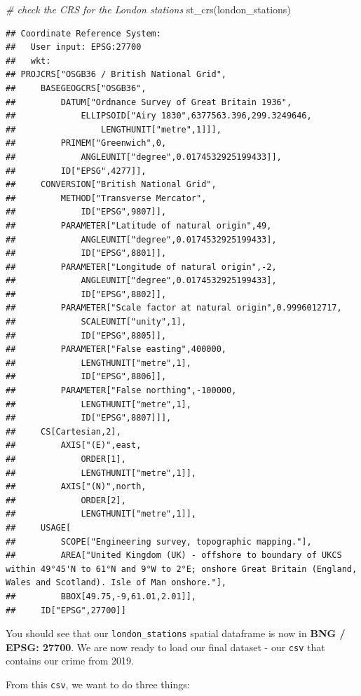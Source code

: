 \documentclass[
]{book}
\newenvironment{Shaded}{\begin{snugshade}}{\end{snugshade}}
\newcommand{\CommentTok}[1]{\textcolor[rgb]{0.56,0.35,0.01}{\textit{#1}}}
\newcommand{\FunctionTok}[1]{\textcolor[rgb]{0.00,0.00,0.00}{#1}}
\newcommand{\NormalTok}[1]{#1}
\begin{document}
\begin{Shaded}
\begin{Highlighting}[]
\CommentTok{\# check the CRS for the London stations}
\FunctionTok{st\_crs}\NormalTok{(london\_stations)}
\end{Highlighting}
\end{Shaded}

\begin{verbatim}
## Coordinate Reference System:
##   User input: EPSG:27700 
##   wkt:
## PROJCRS["OSGB36 / British National Grid",
##     BASEGEOGCRS["OSGB36",
##         DATUM["Ordnance Survey of Great Britain 1936",
##             ELLIPSOID["Airy 1830",6377563.396,299.3249646,
##                 LENGTHUNIT["metre",1]]],
##         PRIMEM["Greenwich",0,
##             ANGLEUNIT["degree",0.0174532925199433]],
##         ID["EPSG",4277]],
##     CONVERSION["British National Grid",
##         METHOD["Transverse Mercator",
##             ID["EPSG",9807]],
##         PARAMETER["Latitude of natural origin",49,
##             ANGLEUNIT["degree",0.0174532925199433],
##             ID["EPSG",8801]],
##         PARAMETER["Longitude of natural origin",-2,
##             ANGLEUNIT["degree",0.0174532925199433],
##             ID["EPSG",8802]],
##         PARAMETER["Scale factor at natural origin",0.9996012717,
##             SCALEUNIT["unity",1],
##             ID["EPSG",8805]],
##         PARAMETER["False easting",400000,
##             LENGTHUNIT["metre",1],
##             ID["EPSG",8806]],
##         PARAMETER["False northing",-100000,
##             LENGTHUNIT["metre",1],
##             ID["EPSG",8807]]],
##     CS[Cartesian,2],
##         AXIS["(E)",east,
##             ORDER[1],
##             LENGTHUNIT["metre",1]],
##         AXIS["(N)",north,
##             ORDER[2],
##             LENGTHUNIT["metre",1]],
##     USAGE[
##         SCOPE["Engineering survey, topographic mapping."],
##         AREA["United Kingdom (UK) - offshore to boundary of UKCS within 49°45'N to 61°N and 9°W to 2°E; onshore Great Britain (England, Wales and Scotland). Isle of Man onshore."],
##         BBOX[49.75,-9,61.01,2.01]],
##     ID["EPSG",27700]]
\end{verbatim}

You should see that our \texttt{london\_stations} spatial dataframe is now in \textbf{BNG / EPSG: 27700}. We are now ready to load our final dataset - our \texttt{csv} that contains our crime from 2019.

From this \texttt{csv}, we want to do three things:
\end{document}
